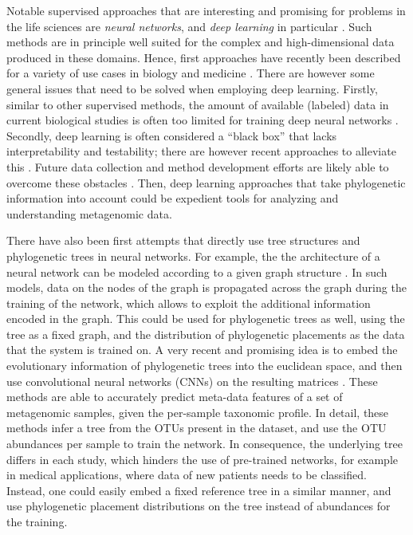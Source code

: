 Notable supervised approaches that are interesting and promising for problems in the life sciences
are \emph{neural networks}, and \emph{deep learning} in particular \cite{Skansi2018}.
Such methods are in principle well suited for the complex and high-dimensional data produced in these domains.
Hence, first approaches have recently been described
for a variety of use cases in biology and medicine \cite{Mamoshina2016,Min2017,Ching2018}.
There are however some general issues that need to be solved when employing deep learning.
Firstly, similar to other supervised methods, the amount of available (labeled) data in current biological studies
is often too limited for training deep neural networks \cite{Min2017,Ching2018}.
Secondly, deep learning is often considered a ``black box'' that lacks interpretability and testability;
there are however recent approaches to alleviate this \cite{Min2017,Reiman2018,Wainberg2018}.
Future data collection and method development efforts are likely able to overcome these obstacles \cite{Wainberg2018}.
Then, deep learning approaches that take phylogenetic information into account
could be expedient tools for analyzing and understanding metagenomic data.

There have also been first attempts that directly use tree structures and phylogenetic trees in neural networks.
For example, the the architecture of a neural network can be modeled
according to a given graph structure \cite{Scarselli2009,Bronstein2017}.
In such models, data on the nodes of the graph is propagated across the graph during the training of the network,
which allows to exploit the additional information encoded in the graph.
This could be used for phylogenetic trees as well, using the tree as a fixed graph,
and the distribution of phylogenetic placements as the data that the system is trained on.
A very recent and promising idea is to embed the evolutionary information of phylogenetic trees into the euclidean space,
and then use convolutional neural networks (CNNs) on the resulting matrices \cite{Fioravanti2018,Reiman2017,Reiman2018}.
These methods are able to accurately predict meta-data features of a set of metagenomic samples,
given the per-sample taxonomic profile.
In detail, these methods infer a tree from the OTUs present in the dataset,
and use the OTU abundances per sample to train the network.
In consequence, the underlying tree differs in each study, which hinders the use of pre-trained networks,
for example in medical applications, where data of new patients needs to be classified.
Instead, one could easily embed a fixed reference tree in a similar manner,
and use phylogenetic placement distributions on the tree instead of abundances for the training.

